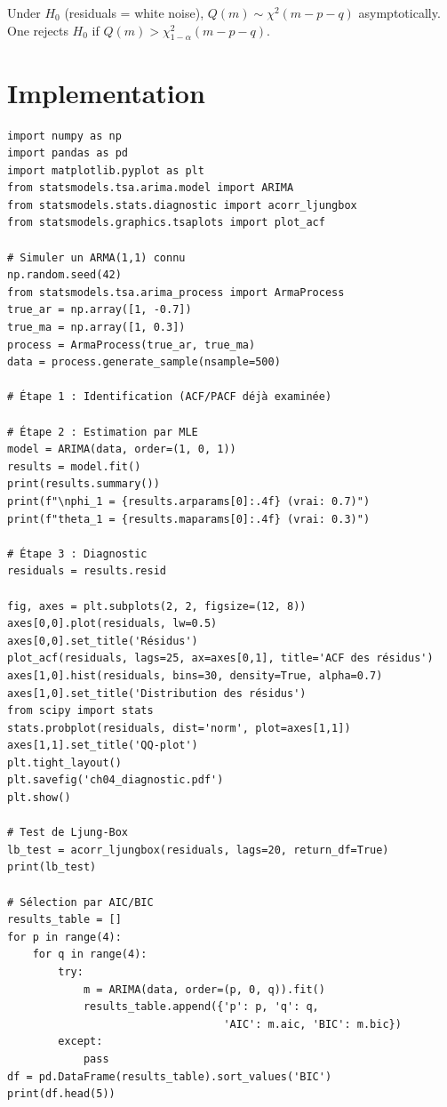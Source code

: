 \begin{theorem}
Under $H_0$ (residuals = white noise), $Q(m)\sim\chi^2(m-p-q)$ asymptotically. One rejects $H_0$ if $Q(m)>\chi^2_{1-\alpha}(m-p-q)$.
\end{theorem}

\section{Implementation}

\begin{codeblock}[title=\textbf{Python}]
\begin{verbatim}
import numpy as np
import pandas as pd
import matplotlib.pyplot as plt
from statsmodels.tsa.arima.model import ARIMA
from statsmodels.stats.diagnostic import acorr_ljungbox
from statsmodels.graphics.tsaplots import plot_acf

# Simuler un ARMA(1,1) connu
np.random.seed(42)
from statsmodels.tsa.arima_process import ArmaProcess
true_ar = np.array([1, -0.7])
true_ma = np.array([1, 0.3])
process = ArmaProcess(true_ar, true_ma)
data = process.generate_sample(nsample=500)

# Étape 1 : Identification (ACF/PACF déjà examinée)

# Étape 2 : Estimation par MLE
model = ARIMA(data, order=(1, 0, 1))
results = model.fit()
print(results.summary())
print(f"\nphi_1 = {results.arparams[0]:.4f} (vrai: 0.7)")
print(f"theta_1 = {results.maparams[0]:.4f} (vrai: 0.3)")

# Étape 3 : Diagnostic
residuals = results.resid

fig, axes = plt.subplots(2, 2, figsize=(12, 8))
axes[0,0].plot(residuals, lw=0.5)
axes[0,0].set_title('Résidus')
plot_acf(residuals, lags=25, ax=axes[0,1], title='ACF des résidus')
axes[1,0].hist(residuals, bins=30, density=True, alpha=0.7)
axes[1,0].set_title('Distribution des résidus')
from scipy import stats
stats.probplot(residuals, dist='norm', plot=axes[1,1])
axes[1,1].set_title('QQ-plot')
plt.tight_layout()
plt.savefig('ch04_diagnostic.pdf')
plt.show()

# Test de Ljung-Box
lb_test = acorr_ljungbox(residuals, lags=20, return_df=True)
print(lb_test)

# Sélection par AIC/BIC
results_table = []
for p in range(4):
    for q in range(4):
        try:
            m = ARIMA(data, order=(p, 0, q)).fit()
            results_table.append({'p': p, 'q': q,
                                  'AIC': m.aic, 'BIC': m.bic})
        except:
            pass
df = pd.DataFrame(results_table).sort_values('BIC')
print(df.head(5))
\end{verbatim}
\end{codeblock}

